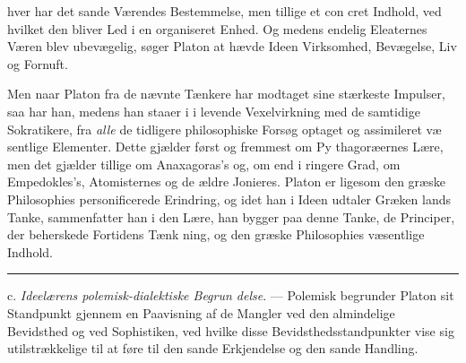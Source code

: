 \documentclass[12pt,a4paper]{book}
\newcommand{\divrule}{\begin{center}\rule{2cm}{0.4pt}\end{center}}
\begin{document}
hver har det sande Værendes Bestemmelse, men tillige et con\-%
cret Indhold, ved hvilket den bliver Led i en organiseret
Enhed. Og medens endelig Eleaternes Væren blev ubevægelig,
søger Platon at hævde Ideen Virksomhed, Bevægelse, Liv og
Fornuft.

Men naar Platon fra de nævnte Tænkere har modtaget
sine stærkeste Impulser, saa har han, medens han staaer i
i levende Vexelvirkning med de samtidige Sokratikere, fra \emph{alle}
de tidligere philosophiske Forsøg optaget og assimileret væ\-%
sentlige Elementer. Dette gjælder først og fremmest om Py\-%
thagoræernes Lære, men det gjælder tillige om Anaxagoras's
og, om end i ringere Grad, om Empedokles's, Atomisternes og
de ældre Jonieres. Platon er ligesom den græske Philosophies
personificerede Erindring, og idet han i Ideen udtaler Græken\-%
lands Tanke, sammenfatter han i den Lære, han bygger paa
denne Tanke, de Principer, der beherskede Fortidens Tænk\-%
ning, og den græske Philosophies væsentlige Indhold.

\divrule

c. \emph{Ideelærens polemisk-dialektiske Begrun\-%
delse}. --- Polemisk begrunder Platon sit Standpunkt gjennem
en Paavisning af de Mangler ved den almindelige Bevidsthed
og ved Sophistiken, ved hvilke disse Bevidsthedsstandpunkter
vise sig utilstrækkelige til at føre til den sande Erkjendelse og
den sande Handling.
\end{document}

